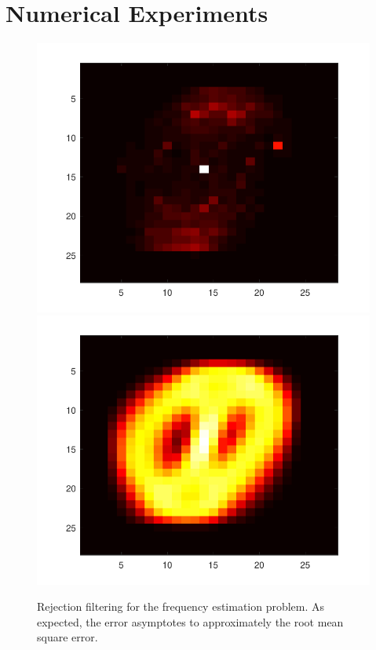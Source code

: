 \documentclass{article} %
\begin{document}
\section{Numerical Experiments}
\begin{figure}
\begin{minipage}[b]{0.45\linewidth}
    \caption{
        \label{fig:crej-diffusion}
        Rejection filtering for the frequency estimation problem.  As expected, the error asymptotes to approximately the root mean square error.
    }
\end{minipage}
\hspace{1mm}
\begin{minipage}[b]{0.45\linewidth}
\centering
\includegraphics[width=0.45\columnwidth]{expHM.pdf}
\includegraphics[width=0.45\columnwidth]{01HM.pdf}\\

\end{minipage}
\end{figure}
\end{document}
